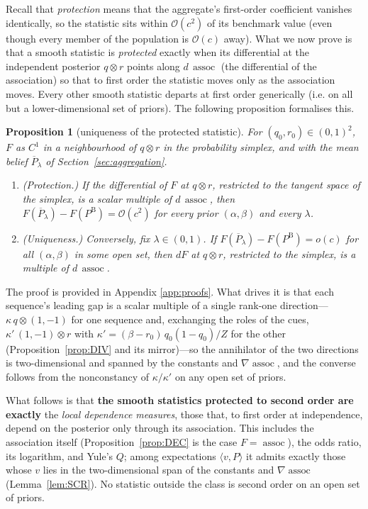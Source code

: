 \documentclass[a4paper,fleqn]{cas-sc}
\newtheorem{proposition}{Proposition}
\theoremstyle{remark}
\theoremstyle{definition}
\newcommand{\PB}{P^{\mathrm{B}}}
\newcommand{\Pbar}{\overline{P}}
\newcommand{\assoc}{\operatorname{assoc}}
\newcommand{\bigO}{\mathcal{O}}
\newcommand{\anchor}[1]{}
\begin{document}
Recall that \emph{protection} means that the aggregate's first-order coefficient vanishes identically, so the statistic sits within $\bigO(c^{2})$ of its benchmark value (even
though every member of the population is $\bigO(c)$ away). What we now prove is that a smooth statistic is \emph{protected} exactly when its differential at the independent posterior $q\otimes r$ points along $d\,\assoc$ (the differential of the association) so that to first order the statistic moves only as the association moves. Every other smooth statistic departs at first order generically (i.e. on all but a lower-dimensional set of priors). The following proposition formalises this.

\renewcommand{\theproposition}{PRO}%
\begin{proposition}[uniqueness of the protected statistic]\label{prop:PRO}
For $(q_0,r_0)\in(0,1)^2$, $F$ as $C^1$ in a neighbourhood of $q\otimes r$ in the
probability simplex, and with the mean belief $\Pbar_\lambda$ of
Section~\ref{sec:aggregation}.
\begin{enumerate}
\item[(i)] \textup{(Protection.)} If the differential of $F$ at $q\otimes r$, restricted to the
tangent space of the simplex, is a scalar multiple of $d\,\assoc$, then
$F(\Pbar_\lambda)-F(\PB)=\bigO(c^2)$ for every prior $(\alpha,\beta)$ and every $\lambda$.
\item[(ii)] \textup{(Uniqueness.)} Conversely, fix $\lambda\in(0,1)$. If
$F(\Pbar_\lambda)-F(\PB)=o(c)$ for all $(\alpha,\beta)$ in some open set, then $dF$ at
$q\otimes r$, restricted to the simplex, is a multiple of $d\,\assoc$.
\end{enumerate}
\anchor{Prop.~PRO}
\end{proposition}

The proof is provided in Appendix \ref{app:proofs}. What drives it is that each sequence's leading gap is a scalar
multiple of a single rank-one direction---$\kappa\,q\otimes(1,-1)$ for one sequence and, exchanging
the roles of the cues, $\kappa'\,(1,-1)\otimes r$ with $\kappa'=(\beta-r_0)\,q_0(1-q_0)/Z$ for
the other (Proposition~\ref{prop:DIV} and its mirror)---so the annihilator of the two directions
is two-dimensional and spanned by the constants and $\nabla\assoc$, and the converse follows
from the nonconstancy of $\kappa/\kappa'$ on any open set of priors.

What follows is that \textbf{the smooth statistics protected to second order are exactly} the \emph{local dependence
measures}, those that, to first order at independence, depend on the posterior only through its
association. This includes the association itself (Proposition~\ref{prop:DEC} is the case
$F=\assoc$), the odds ratio, its logarithm, and Yule's $Q$; among expectations
$\langle v,P\rangle$ it admits exactly those whose $v$ lies in the two-dimensional span of the
constants and $\nabla\assoc$ (Lemma~\ref{lem:SCR}). No statistic outside the class is second order on an open
set of priors.
\end{document}

